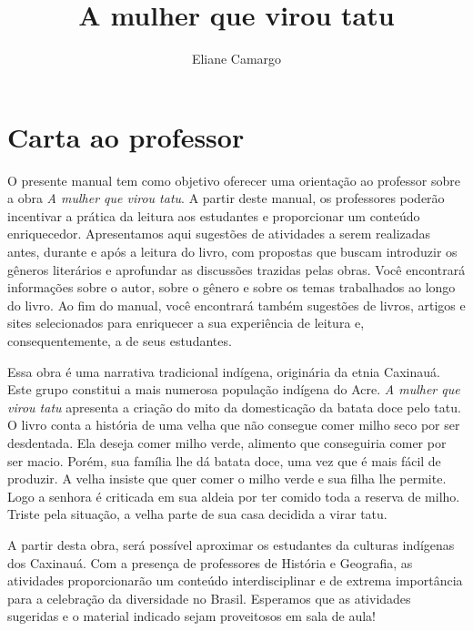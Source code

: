 \documentclass[11pt]{extarticle}
\newcommand{\AutorLivro}{Eliane Camargo}
\newcommand{\TituloLivro}{A mulher que virou tatu}
\newcommand{\colaborador}{Ana Lancman}
\begin{document}
\title{\TituloLivro}
\author{\AutorLivro}
\def\authornotes{\colaborador}

\date{}
\maketitle


\tableofcontents

\section{Carta ao professor}

O presente manual tem como objetivo oferecer uma orientação ao professor sobre a obra \textit{A mulher que virou tatu}. A partir deste manual, os professores poderão incentivar a prática da leitura aos estudantes e proporcionar um conteúdo enriquecedor. Apresentamos aqui sugestões de atividades a serem realizadas antes, durante e após a leitura do livro, com propostas que buscam introduzir os gêneros literários e aprofundar as discussões trazidas pelas obras. Você encontrará informações sobre o autor, sobre o gênero e sobre os temas trabalhados ao longo do livro. Ao fim do manual, você encontrará também sugestões de livros, artigos e sites selecionados para enriquecer a sua experiência de leitura e, consequentemente, a de seus estudantes.

Essa obra é uma narrativa tradicional indígena, originária da etnia Caxinauá. Este grupo constitui a mais numerosa população indígena do Acre. \textit{A mulher que virou tatu} apresenta a criação do mito da domesticação da batata doce pelo tatu. O livro conta a história de uma velha que não consegue comer milho seco por ser desdentada. Ela deseja comer milho verde, alimento que conseguiria comer por ser macio. Porém, sua família lhe dá batata doce, uma vez que é mais fácil de produzir. A velha insiste que quer comer o milho verde e sua filha lhe permite. Logo a senhora é criticada em sua aldeia por ter comido toda a reserva de milho. Triste pela situação, a velha parte de sua casa decidida a virar tatu. 

A partir desta obra, será possível aproximar os estudantes da culturas indígenas dos Caxinauá. Com a presença de professores de História e Geografia, as atividades proporcionarão um conteúdo interdisciplinar e de extrema importância para a celebração da diversidade no Brasil. Esperamos que as atividades sugeridas e o material indicado sejam proveitosos em sala de aula! 
\end{document}

